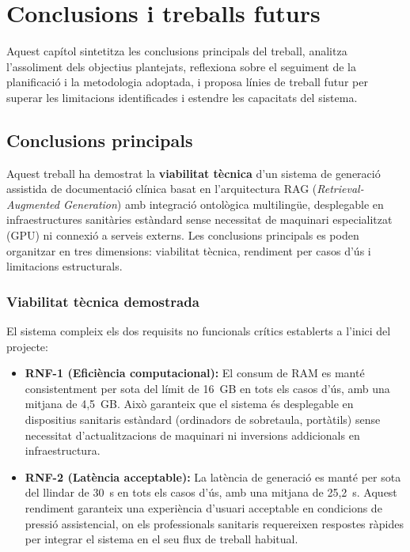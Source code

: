 \documentclass[CAT]{TFUOC}%
\begin{document}
\chapter{Conclusions i treballs futurs}

Aquest capítol sintetitza les conclusions principals del treball, analitza l'assoliment dels objectius plantejats, reflexiona sobre el seguiment de la planificació i la metodologia adoptada, i proposa línies de treball futur per superar les limitacions identificades i estendre les capacitats del sistema.

\section{Conclusions principals}

Aquest treball ha demostrat la \textbf{viabilitat tècnica} d'un sistema de generació assistida de documentació clínica basat en l'arquitectura RAG (\textit{Retrieval-Augmented Generation}) amb integració ontològica multilingüe, desplegable en infraestructures sanitàries estàndard sense necessitat de maquinari especialitzat (GPU) ni connexió a serveis externs. Les conclusions principals es poden organitzar en tres dimensions: viabilitat tècnica, rendiment per casos d'ús i limitacions estructurals.

\subsection{Viabilitat tècnica demostrada}

El sistema compleix els dos requisits no funcionals crítics establerts a l'inici del projecte:

\begin{itemize}
    \item \textbf{RNF-1 (Eficiència computacional):} El consum de RAM es manté consistentment per sota del límit de 16~GB en tots els casos d'ús, amb una mitjana de 4,5~GB. Això garanteix que el sistema és desplegable en dispositius sanitaris estàndard (ordinadors de sobretaula, portàtils) sense necessitat d'actualitzacions de maquinari ni inversions addicionals en infraestructura.
    
    \item \textbf{RNF-2 (Latència acceptable):} La latència de generació es manté per sota del llindar de 30~s en tots els casos d'ús, amb una mitjana de 25,2~s. Aquest rendiment garanteix una experiència d'usuari acceptable en condicions de pressió assistencial, on els professionals sanitaris requereixen respostes ràpides per integrar el sistema en el seu flux de treball habitual.
\end{itemize}
\end{document}
